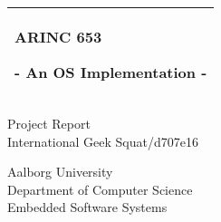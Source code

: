 %
\begin{titlepage}
	\addtolength{\hoffset}{0.5\evensidemargin-0.5\oddsidemargin} %
	\noindent%
	\begin{tabular}{@{}p{\textwidth}@{}}
		\toprule[2pt]
		\midrule
		\vspace{0.2cm}
		\begin{center}
			\Huge{\textbf{
				ARINC 653
			}}
		\end{center}
		\begin{center}
			\Large{
				- An OS Implementation -
			}
		\end{center}
		\vspace{0.2cm}\\
		\midrule
		\toprule[2pt]
	\end{tabular}
	\vspace{4 cm}
	\begin{center}
		{\large
			Project Report
		}\\
		\vspace{0.2cm}
		{\Large
			International Geek Squat/d707e16
		}
	\end{center}
	\vfill
	\begin{center}
		Aalborg University\\
		Department of Computer Science\\
		Embedded Software Systems
	\end{center}
\end{titlepage}
\clearpage
